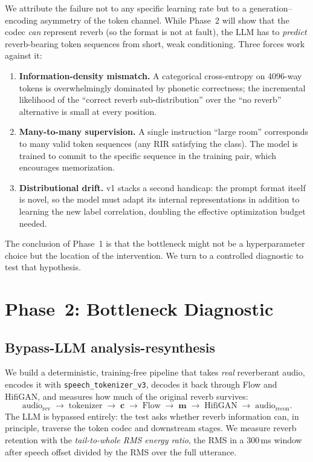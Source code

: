 \documentclass{article}
\begin{document}
We attribute the failure not to any specific learning rate but to a
generation--encoding asymmetry of the token channel. While
Phase~2 will show that the codec \emph{can} represent reverb (so the format is
not at fault), the LLM has to \emph{predict} reverb-bearing token sequences
from short, weak conditioning. Three forces work against it:

\begin{enumerate}
\item \textbf{Information-density mismatch.} A categorical cross-entropy on
4096-way tokens is overwhelmingly dominated by phonetic correctness; the
incremental likelihood of the ``correct reverb sub-distribution'' over the
``no reverb'' alternative is small at every position.
\item \textbf{Many-to-many supervision.} A single instruction
``large room'' corresponds to many valid token sequences (any RIR satisfying
the class). The model is trained to commit to the specific sequence in the
training pair, which encourages memorization.
\item \textbf{Distributional drift.} v1 stacks a second handicap: the prompt
format itself is novel, so the model must adapt its internal representations
in addition to learning the new label correlation, doubling the effective
optimization budget needed.
\end{enumerate}

The conclusion of Phase~1 is that the bottleneck might not be a hyperparameter
choice but the location of the intervention. We turn to a controlled
diagnostic to test that hypothesis.

\section{Phase~2: Bottleneck Diagnostic}

\subsection{Bypass-LLM analysis-resynthesis}

We build a deterministic, training-free pipeline that takes \emph{real}
reverberant audio, encodes it with \texttt{speech\_tokenizer\_v3}, decodes it
back through Flow and HifiGAN, and measures how much of the original reverb
survives:
\begin{equation}
\text{audio}_{\text{rev}}\;\to\;\text{tokenizer}\;\to\;\mathbf{c}\;\to\;\text{Flow}\;\to\;\mathbf{m}\;\to\;\text{HifiGAN}\;\to\;\text{audio}_{\text{recon}}.
\end{equation}
The LLM is bypassed entirely: the test asks whether reverb information can,
in principle, traverse the token codec and downstream stages. We measure
reverb retention with the \emph{tail-to-whole RMS energy ratio}, the RMS in
a 300\,ms window after speech offset divided by the RMS over the full
utterance.
\end{document}
